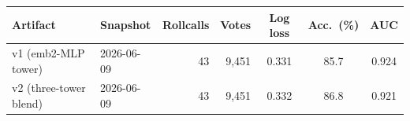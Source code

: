 \begin{tabular}{llrrccc}
\toprule
Artifact & Snapshot & Rollcalls & Votes & Log loss & Acc.\ (\%) & AUC \\
\midrule
v1 (emb2-MLP tower) & 2026-06-09 & 43 & 9,451 & 0.331 & 85.7 & 0.924 \\
v2 (three-tower blend) & 2026-06-09 & 43 & 9,451 & 0.332 & 86.8 & 0.921 \\
\bottomrule
\end{tabular}
